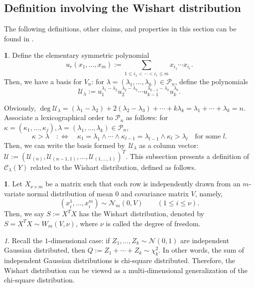 \documentclass{mathincs}
\numberwithin{equation}{section}
\numberwithin{figure}{section}
\theoremstyle{plain}
\theoremstyle{definition}
\newtheorem{defn}[thm]{\protect\definitionname}
\theoremstyle{remark}
\newtheorem{rem}[thm]{\protect\remarkname}
\theoremstyle{plain}
\theoremstyle{definition}
\theoremstyle{plain}
\theoremstyle{plain}
\providecommand{\definitionname}{Definition}
\providecommand{\remarkname}{Remark}
\begin{document}
\subsection{Definition involving the Wishart distribution}\label{sec:Wishart}
The following definitions, other claims, and properties in this section
can be found in \cite[pp.~9--22]{Takemura}.
\begin{defn}
Define the elementary symmetric polynomial
\[
  u_{r}(x_{1},\ldots,x_{m}):=\underset{1\leq i_{1}<\cdots<i_{r}\leq m}{\sum}x_{i_{1}}\cdots x_{i_{r}}.
\]
Then, we have a basis for $V_n$: for $\lambda=(\lambda_{1},\ldots,\lambda_{k})\in\mathcal{P}_{n}$, define the polynomials
\[
  \mathcal{U}_{\lambda} :=
  u_{1}^{\lambda_{1}-\lambda_{2}}u_{2}^{\lambda_{2}-\lambda_{3}}\cdots u_{k-1}^{\lambda_{k-1}-\lambda_{k}}u_{k}^{\lambda_{k}}.
\]
\end{defn}
\noindent
Obviously,
$\deg\mathcal{U}_{\lambda} =
  \left(\lambda_{1}-\lambda_{2}\right)+2\left(\lambda_{2}-\lambda_{3}\right)+\cdots+k\lambda_{k} =
  \lambda_{1}+\cdots+\lambda_{k}=n$.
Associate a lexicographical order to $\mathcal{P}_{n}$ as follows:
for $\kappa=\left(\kappa_1,\ldots,\kappa_j\right),\lambda=\left(\lambda_1,\ldots,\lambda_k\right)\in\mathcal{P}_{n}$,
\[
  \kappa>\lambda \quad:\Leftrightarrow\quad
  \kappa_1=\lambda_1\land\cdots\land\kappa_{l-1}=\lambda_{l-1}\land\kappa_{l}>\lambda_{l}
  \quad\text{for some }l.
\]
Then, we can write the basis formed by~$\mathcal{U}_{\lambda}$
as a column vector:
$
\mathcal{U}:=\left(\mathcal{U}_{(n)},\mathcal{U}_{(n-1,1)},\ldots,\mathcal{U}_{(1,\ldots,1)}\right)^{T}\!\!\!.
$
This subsection presents a definition of $\mathcal{C}_{\lambda}(Y)$
related to the Wishart distribution, defined as follows.
\begin{defn}
Let $X_{\nu\times m}$ be a matrix such that each row is independently drawn
from an $m$-variate normal distribution of mean $0$ and covariance
matrix $V$, namely, 
\[
  (x_{i}^{1},\ldots,x_{i}^{m})\sim\mathcal{N}_{m}(0,V)
  \qquad (1\leq i\leq\nu).
\]
Then, we say $S:=X^{T}X$ has the Wishart distribution, denoted by $S=X^{T}X\sim W_{m}(V,\nu)$, where $\nu$ is called the degree of freedom.
\end{defn}
\begin{rem}
Recall the $1$-dimensional case: if $Z_{1},\ldots,Z_{k}\sim\mathcal{N}(0,1)$
are independent Gaussian distributed, then $Q:=Z_{1}+\cdots+Z_{k}\sim\chi_{k}^{2}$.
In other words, the sum of independent Gaussian distributions is chi-square
distributed. Therefore, the Wishart distribution can be viewed as a multi-dimensional
generalization of the chi-square distribution.
\end{rem}
\end{document}
